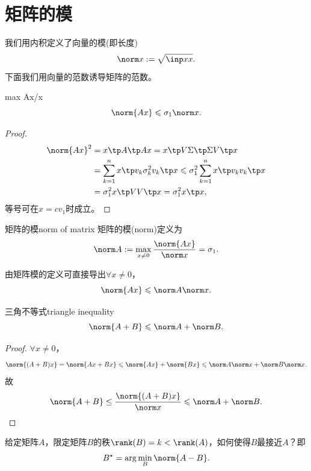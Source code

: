 \section{矩阵的模}

我们用内积定义了向量的模(即长度)
\[
	\norm x:=\sqrt{\inp xx}.
\]
下面我们用向量的范数诱导矩阵的范数。
\begin{theorem}{}{max Ax/x}
	\begin{equation}
		\norm{Ax}\leqslant\sigma_1\norm x.
	\end{equation}
\end{theorem}
\begin{proof}
	
	\begin{align*}
		\norm{Ax}^2&=x\tp A\tp Ax=x\tp V\Sigma\tp\Sigma V\tp x\\
		&=\sum_{k=1}^nx\tp v_k\sigma_k^2v_k\tp x\leqslant\sigma_1^2\sum_{k=1}^nx\tp v_kv_k\tp x\\
		&=\sigma_1^2x\tp VV\tp x=\sigma_1^2x\tp x,
	\end{align*}
	等号可在$x=cv_1$时成立。
\end{proof}
\begin{definition}{矩阵的模}{norm of matrix}
	矩阵的模(norm)定义为 
	\begin{equation}
		\norm A:=\max_{x\neq 0}\frac{\norm{Ax}}{\norm x}=\sigma_1.
	\end{equation}
\end{definition}
\begin{corollary}
	由矩阵模的定义可直接导出$\forall x\neq 0$，
	\[
		\norm{Ax}\leqslant\norm A\norm x.
	\]
\end{corollary}
\begin{theorem}{三角不等式}{triangle inequality}
	\begin{equation}
		\norm{A+B}\leqslant\norm A+\norm B.
	\end{equation}
\end{theorem}
\begin{proof}
	$\forall x\neq 0$，
	\[
		\norm{(A+B)x}=\norm{Ax+Bx}\leqslant\norm{Ax}+\norm{Bx}\leqslant\norm A\norm x+\norm B\norm x.
	\]
	故
	\[
		\norm{A+B}\leq\frac{\norm{(A+B)x}}{\norm x}\leqslant\norm A+\norm B.
	\]
\end{proof}

给定矩阵$A$，限定矩阵$B$的秩$\rank(B)=k<\rank(A)$，如何使得$B$最接近$A$？即
\[
	B^\star=\arg\min_B\norm{A-B}.
\]

